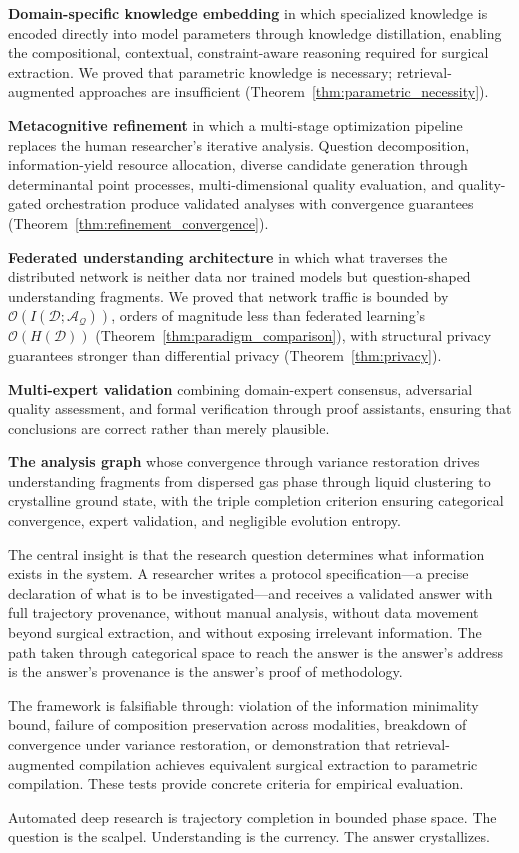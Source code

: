\documentclass[10pt,twocolumn]{article}
\theoremstyle{definition}
\theoremstyle{remark}
\newcommand{\question}{\mathcal{Q}}
\newcommand{\answer}{\mathcal{A}}
\newcommand{\dataset}{\mathcal{D}}
\begin{document}
\textbf{Domain-specific knowledge embedding} in which specialized knowledge is encoded directly into model parameters through knowledge distillation, enabling the compositional, contextual, constraint-aware reasoning required for surgical extraction. We proved that parametric knowledge is necessary; retrieval-augmented approaches are insufficient (Theorem~\ref{thm:parametric_necessity}).

\textbf{Metacognitive refinement} in which a multi-stage optimization pipeline replaces the human researcher's iterative analysis. Question decomposition, information-yield resource allocation, diverse candidate generation through determinantal point processes, multi-dimensional quality evaluation, and quality-gated orchestration produce validated analyses with convergence guarantees (Theorem~\ref{thm:refinement_convergence}).

\textbf{Federated understanding architecture} in which what traverses the distributed network is neither data nor trained models but question-shaped understanding fragments. We proved that network traffic is bounded by $\mathcal{O}(I(\dataset; \answer_\question))$, orders of magnitude less than federated learning's $\mathcal{O}(H(\dataset))$ (Theorem~\ref{thm:paradigm_comparison}), with structural privacy guarantees stronger than differential privacy (Theorem~\ref{thm:privacy}).

\textbf{Multi-expert validation} combining domain-expert consensus, adversarial quality assessment, and formal verification through proof assistants, ensuring that conclusions are correct rather than merely plausible.

\textbf{The analysis graph} whose convergence through variance restoration drives understanding fragments from dispersed gas phase through liquid clustering to crystalline ground state, with the triple completion criterion ensuring categorical convergence, expert validation, and negligible evolution entropy.

The central insight is that the research question determines what information exists in the system. A researcher writes a protocol specification---a precise declaration of what is to be investigated---and receives a validated answer with full trajectory provenance, without manual analysis, without data movement beyond surgical extraction, and without exposing irrelevant information. The path taken through categorical space to reach the answer is the answer's address is the answer's provenance is the answer's proof of methodology.

The framework is falsifiable through: violation of the information minimality bound, failure of composition preservation across modalities, breakdown of convergence under variance restoration, or demonstration that retrieval-augmented compilation achieves equivalent surgical extraction to parametric compilation. These tests provide concrete criteria for empirical evaluation.

Automated deep research is trajectory completion in bounded phase space. The question is the scalpel. Understanding is the currency. The answer crystallizes.



\end{document}
